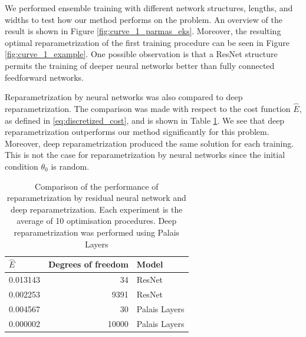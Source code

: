 We performed ensemble training with different network structures, lengths, and widths to test how our method performs on the problem. An overview of the result is shown in Figure \ref{fig:curve_1_parmas_eks}. Moreover, the resulting optimal reparametrization of the first training procedure can be seen in Figure \ref{fig:curve_1_example}. One possible observation is that a ResNet structure permits the training of deeper neural networks better than fully connected feedforward networks.

Reparametrization by neural networks was also compared to deep reparametrization. The comparison was made with respect to the cost function \(\hat E\), as defined in \eqref{eq:discretized_cost}, and is shown in Table \ref{tab:comare_res_palais}. We see that deep reparametrization outperforms our method significantly for this problem. Moreover, deep reparametrization produced the same solution for each training. This is not the case for reparametrization by neural networks since the initial condition \(\theta_0\) is random.
\begin{table}[b]
    \centering
    \begin{tabular}{lrl}
        \toprule
        \(\hat{E} \) & Degrees of freedom & Model         \\
        \midrule
        0.013143     & 34                 & ResNet        \\
        0.002253     & 9391               & ResNet        \\
        0.004567     & 30                 & Palais Layers \\
        0.000002     & 10000              & Palais Layers \\
        \bottomrule
    \end{tabular}
    \caption{Comparison of the performance of reparametrization by residual neural network and deep reparametrization. Each experiment is the average of 10 optimisation procedures. Deep reparametrization was performed using Palais Layers} \label{tab:comare_res_palais}
\end{table}
